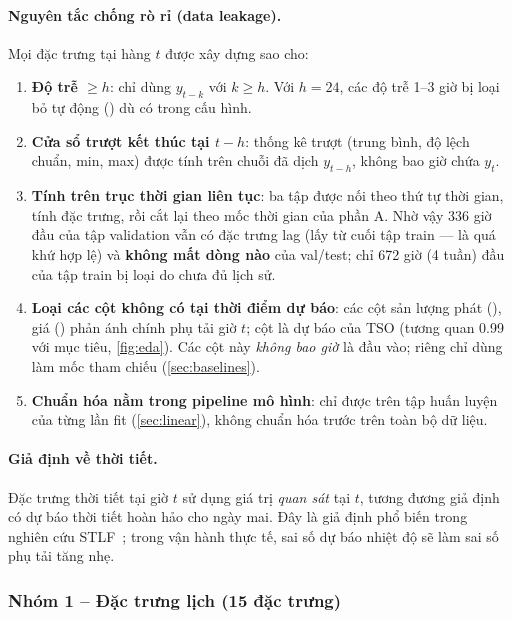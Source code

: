 \paragraph{Nguyên tắc chống rò rỉ (data leakage).} Mọi đặc trưng tại hàng $t$ được xây dựng sao cho:
\begin{enumerate}
  \item \textbf{Độ trễ $\geq h$}: chỉ dùng $y_{t-k}$ với $k\geq h$. Với $h=24$, các độ trễ 1--3 giờ bị
        loại bỏ tự động () dù có trong cấu hình.
  \item \textbf{Cửa sổ trượt kết thúc tại $t-h$}: thống kê trượt (trung bình, độ lệch chuẩn, min, max)
        được tính trên chuỗi đã dịch $y_{t-h}$, không bao giờ chứa $y_t$.
  \item \textbf{Tính trên trục thời gian liên tục}: ba tập được nối theo thứ tự thời gian, tính đặc trưng,
        rồi cắt lại theo mốc thời gian của phần A. Nhờ vậy 336 giờ đầu của tập validation vẫn có đặc trưng
        lag (lấy từ cuối tập train --- là quá khứ hợp lệ) và \textbf{không mất dòng nào} của val/test; chỉ
        672 giờ (4 tuần) đầu của tập train bị loại do chưa đủ lịch sử.
  \item \textbf{Loại các cột không có tại thời điểm dự báo}: các cột sản lượng phát (),
        giá () phản ánh chính phụ tải giờ $t$; cột  là dự báo
        của TSO (tương quan 0.99 với mục tiêu, \cref{fig:eda}). Các cột này \emph{không bao giờ} là đầu vào;
        riêng  chỉ dùng làm mốc tham chiếu (\cref{sec:baselines}).
  \item \textbf{Chuẩn hóa nằm trong pipeline mô hình}:  chỉ được  trên tập
        huấn luyện của từng lần fit (\cref{sec:linear}), không chuẩn hóa trước trên toàn bộ dữ liệu.
\end{enumerate}

\paragraph{Giả định về thời tiết.} Đặc trưng thời tiết tại giờ $t$ sử dụng giá trị \emph{quan sát} tại $t$,
tương đương giả định có dự báo thời tiết hoàn hảo cho ngày mai. Đây là giả định phổ biến trong nghiên cứu
STLF~\cite{hong2016probabilistic}; trong vận hành thực tế, sai số dự báo nhiệt độ sẽ làm sai số phụ tải tăng nhẹ.

\subsubsection{Nhóm 1 -- Đặc trưng lịch (15 đặc trưng)}\label{sec:feat-cal}

